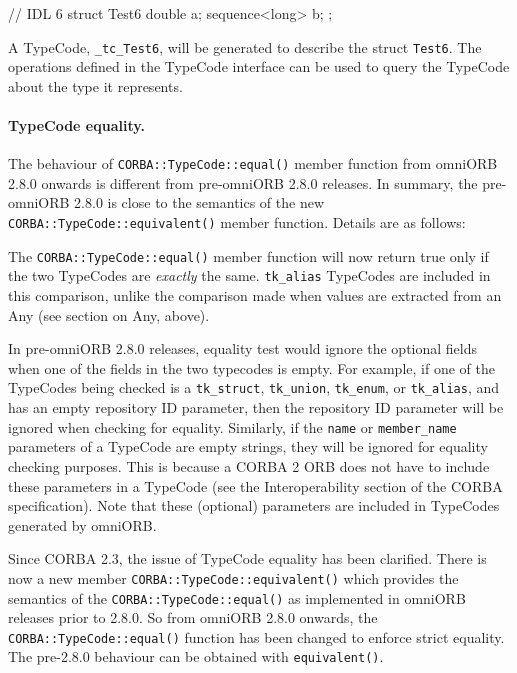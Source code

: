 \documentclass[11pt,twoside,a4paper]{book}
\newcommand{\type}[1]{\texttt{#1}}
\newcommand{\code}[1]{\texttt{#1}}
\newcommand{\op}[1]{\texttt{#1()}}
\newcommand{\dsc}{\discretionary{}{}{}}
\begin{document}
\begin{idllisting}
// IDL 6
struct Test6 {
  double a;
  sequence<long> b;
};
\end{idllisting}

A TypeCode, \code{\_tc\_Test6}, will be generated to describe the
struct \type{Test6}. The operations defined in the TypeCode interface
can be used to query the TypeCode about the type it represents.


\paragraph*{TypeCode equality.}

The behaviour of \op{CORBA::TypeCode::equal} member function from
omniORB 2.8.0 onwards is different from pre-omniORB 2.8.0 releases.
In summary, the pre-omniORB 2.8.0 is close to the semantics of the new
\op{CORBA::TypeCode::equivalent} member function. Details are as
follows:

The \op{CORBA::TypeCode::equal} member function will now return true
only if the two TypeCodes are \emph{exactly} the same.
\code{tk\_alias} TypeCodes are included in this comparison, unlike the
comparison made when values are extracted from an Any (see section on
Any, above).

In pre-omniORB 2.8.0 releases, equality test would ignore the optional
fields when one of the fields in the two typecodes is empty. For
example, if one of the TypeCodes being checked is a \code{tk\_struct},
\code{tk\_union}, \code{tk\_enum}, or \code{tk\_alias}, and has an
empty repository ID parameter, then the repository ID parameter will
be ignored when checking for equality.  Similarly, if the \code{name}
or \code{member\_name} parameters of a TypeCode are empty strings,
they will be ignored for equality checking purposes. This is because a
CORBA 2 ORB does not have to include these parameters in a TypeCode
(see the Interoperability section of the CORBA specification). Note
that these (optional) parameters are included in TypeCodes generated
by omniORB.

Since CORBA 2.3, the issue of TypeCode equality has been clarified.
There is now a new member \op{CORBA::TypeCode::equivalent} which
provides the semantics of the \op{CORBA::TypeCode::equal} as
implemented in omniORB releases prior to 2.8.0. So from omniORB 2.8.0
onwards, the \op{CORBA::TypeCode::\dsc{}equal} function has been
changed to enforce strict equality.  The pre-2.8.0 behaviour can be
obtained with \op{equivalent}.
\end{document}
